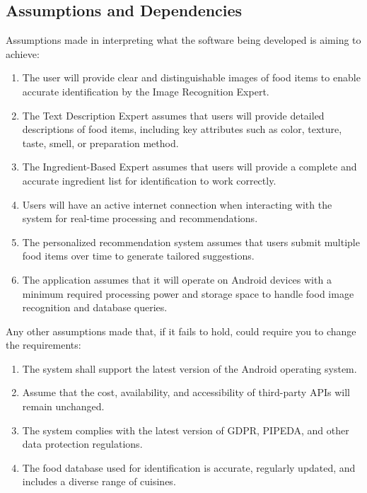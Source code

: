 \documentclass[]{article}
\begin{document}
\subsection{Assumptions and Dependencies}
\label{sub:assumptions_and_dependencies}
Assumptions made in interpreting what the software being developed is aiming to achieve:
	\begin{enumerate}
		\item The user will provide clear and distinguishable images of food items to enable accurate identification by the Image Recognition Expert.
		\item The Text Description Expert assumes that users will provide detailed descriptions of food items, including key attributes such as color, texture, taste, smell, or preparation method.
		\item The Ingredient-Based Expert assumes that users will provide a complete and accurate ingredient list for identification to work correctly.
		\item Users will have an active internet connection when interacting with the system for real-time processing and recommendations.
		\item The personalized recommendation system assumes that users submit multiple food items over time to generate tailored suggestions.
		\item The application assumes that it will operate on Android devices with a minimum required processing power and storage space to handle food image recognition and database queries.
	\end{enumerate}

Any other assumptions made that, if it fails to hold, could require you to change the requirements:
	\begin{enumerate}
		\item The system shall support the latest version of the Android operating system.
		\item Assume that the cost, availability, and accessibility of third-party APIs will remain unchanged.
		\item The system complies with the latest version of GDPR, PIPEDA, and other data protection regulations.
		\item The food database used for identification is accurate, regularly updated, and includes a diverse range of cuisines.
	\end{enumerate}
\end{document}
